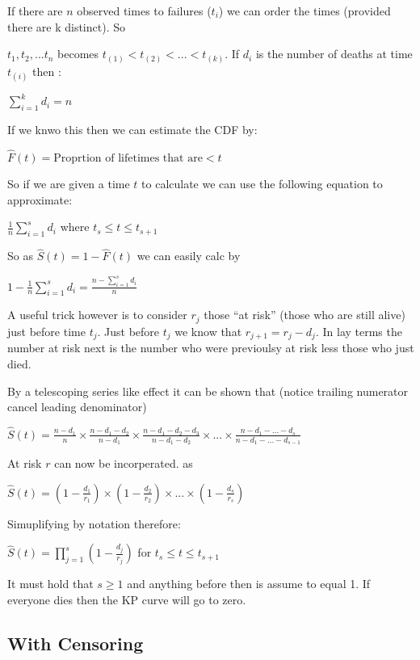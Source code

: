 \documentclass[
  letterpaper,
  DIV=11,
  numbers=noendperiod]{scrreprt}
\begin{document}
If there are \(n\) observed times to failures (\(t_i\)) we can order the
times (provided there are k distinct). So

\(t_1, t_2, ... t_n\) becomes \(t_{(1)} < t_{(2)} < ... < t_{(k)}\). If
\(d_i\) is the number of deaths at time \(t_{(i)}\) then :

\(\sum_{i=1}^k d_i = n\)

If we knwo this then we can estimate the CDF by:

\(\hat{F}(t) = \text{Proprtion of lifetimes that are} < t\)

So if we are given a time \(t\) to calculate we can use the following
equation to approximate:

\(\frac{1}{n} \sum^{s}_{i=1}d_i\) where \(t_s\leq t \leq t_{s+1}\)

So as \(\hat{S}(t) = 1 - \hat{F}(t)\) we can easily calc by

\(1 - \frac{1}{n} \sum^{s}_{i=1}d_i = \frac{n - \sum^{s}_{i=1}d_i }{n}\)

A useful trick however is to consider \(r_j\) those ``at risk'' (those
who are still alive) just before time \(t_j\). Just before \(t_j\) we
know that \(r_{j+1} = r_j - d_j\). In lay terms the number at risk next
is the number who were previoulsy at risk less those who just died.

By a telescoping series like effect it can be shown that (notice
trailing numerator cancel leading denominator)

\(\hat{S}(t) = \frac{n-d_1}{n} \times \frac{n-d_1 - d_2}{n - d_1} \times \frac{n-d_1 - d_2- d_3}{n - d_1 - d_2} \times ... \times \frac{n - d_1 - ... - d_s}{n - d_1 - ... - d_{s-1}}\)

At risk \(r\) can now be incorperated. as

\(\hat{S}(t) = (1 - \frac{d_1}{r_1}) \times (1 - \frac{d_2}{r_2}) \times ... \times (1 - \frac{d_s}{r_s})\)

Simuplifying by notation therefore:

\(\hat{S}(t) = \prod^s_{j=1}( 1 - \frac{d_j}{r_j})\) for
\(t_s\leq t \leq t_{s+1}\)

It must hold that \(s\geq 1\) and anything before then is assume to
equal 1. If everyone dies then the KP curve will go to zero.

\hypertarget{with-censoring}{%
\subsection{With Censoring}\label{with-censoring}}
\end{document}
